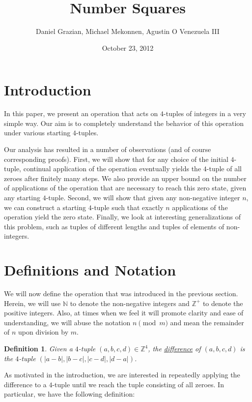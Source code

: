 \documentclass[12pt]{amsart}
\title{Number Squares}
\author{Daniel Grazian, Michael Mekonnen, Agustin O Venezuela III}
\date{October 23, 2012}
\newtheorem{definition}[theorem]{Definition}
\newcommand{\znn}{\mathbb{N}}
\newcommand{\zp}{\mathbb{Z}^+}
\begin{document}
\begin{abstract}
\end{abstract}

\maketitle

\section{Introduction\label{sec:intro}}

In this paper, we present an operation that acts on $4$-tuples of integers in a very simple way. Our aim is to completely understand the behavior of this operation under various starting $4$-tuples.

Our analysis has resulted in a number of observations (and of course corresponding proofs). First, we will show that for any choice of the initial $4$-tuple, continual application of the operation eventually yields the $4$-tuple of all zeroes after finitely many steps. We also provide an upper bound on the number of applications of the operation that are necessary to reach this zero state, given any starting $4$-tuple. Second, we will show that given any non-negative integer $n$, we can construct a starting $4$-tuple such that exactly $n$ applications of the operation yield the zero state. Finally, we look at interesting generalizations of this problem, such as tuples of different lengths and tuples of elements of non-integers.

\section{Definitions and Notation\label{sec:defs}}

We will now define the operation that was introduced in the previous section. Herein, we will use $\znn$ to denote the non-negative integers and $\zp$ to denote the positive integers. Also, at times when we feel it will promote clarity and ease of understanding, we will abuse the notation $n\pmod{m}$ and mean the remainder of $n$ upon division by $m$.

\begin{definition}
Given a $4$-tuple $(a, b, c, d)\in \mathbb{Z}^4$, the \underline{difference} of $(a, b, c, d)$ is the $4$-tuple $(|a - b|, |b - c|, |c - d|, |d - a|)$.
\end{definition}

As motivated in the introduction, we are interested in repeatedly applying the difference to a $4$-tuple until we reach the tuple consisting of all zeroes. In particular, we have the following definition:
\end{document}
